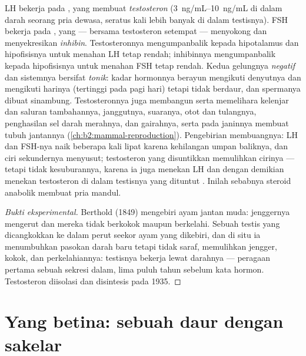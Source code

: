 \begin{proposition}\label{prop:b2:reproductive-hormones:testis}
LH bekerja pada , yang membuat \emph{testosteron}
(\qtyrange{3}{10}{ng/mL} di dalam darah seorang pria dewasa, seratus
kali lebih banyak di dalam testisnya). FSH bekerja pada ,
yang --- bersama testosteron setempat --- menyokong 
dan menyekresikan \emph{inhibin}. Testosteronnya mengumpanbalik kepada
hipotalamus dan hipofisisnya untuk menahan LH tetap rendah; inhibinnya
mengumpanbalik kepada hipofisisnya untuk menahan FSH tetap rendah.
Kedua gelungnya \emph{negatif} dan sistemnya bersifat \emph{tonik}:
kadar hormonnya berayun mengikuti denyutnya dan mengikuti harinya
(tertinggi pada pagi hari) tetapi tidak berdaur, dan spermanya dibuat
sinambung. Testosteronnya juga membangun serta memelihara kelenjar dan
saluran tambahannya, janggutnya, suaranya, otot dan tulangnya,
penghasilan sel darah merahnya, dan gairahnya, serta pada janinnya
membuat tubuh jantannya (\cref{ch:b2:mammal-reproduction}). Pengebirian
membuangnya: LH dan FSH-nya naik beberapa kali lipat karena kehilangan
umpan baliknya, dan ciri sekundernya menyusut; testosteron yang
disuntikkan memulihkan cirinya --- tetapi tidak kesuburannya, karena ia
juga menekan LH dan dengan demikian menekan testosteron di dalam
testisnya yang dituntut . Inilah sebabnya steroid
anabolik membuat pria mandul.
\end{proposition}
\begin{proof}[Bukti eksperimental]
Berthold (1849) mengebiri ayam jantan muda: jenggernya mengerut dan
mereka tidak berkokok maupun berkelahi. Sebuah testis yang dicangkokkan
ke dalam perut seekor ayam yang dikebiri, dan di situ ia menumbuhkan
pasokan darah baru tetapi tidak saraf, memulihkan jengger, kokok, dan
perkelahiannya: testisnya bekerja lewat darahnya --- peragaan pertama
sebuah sekresi dalam, lima puluh tahun sebelum kata hormon.
Testosteron diisolasi dan disintesis pada 1935.
\end{proof}

\section{Yang betina: sebuah daur dengan sakelar}

